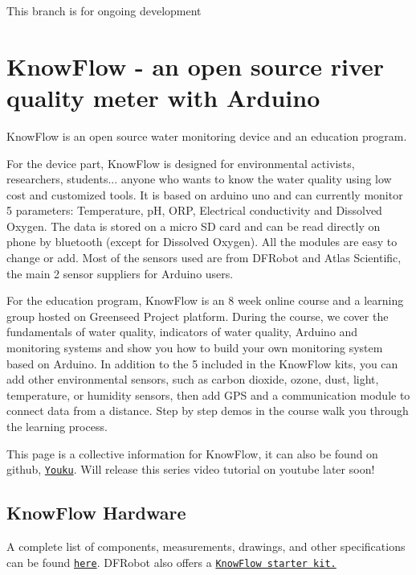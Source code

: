 This branch is for ongoing development

\section*{Know\+Flow -\/ an open source river quality meter with Arduino}

Know\+Flow is an open source water monitoring device and an education program.



For the device part, Know\+Flow is designed for environmental activists, researchers, students... anyone who wants to know the water quality using low cost and customized tools. It is based on arduino uno and can currently monitor 5 parameters\+: Temperature, pH, O\+RP, Electrical conductivity and Dissolved Oxygen. The data is stored on a micro SD card and can be read directly on phone by bluetooth (except for Dissolved Oxygen). All the modules are easy to change or add. Most of the sensors used are from D\+F\+Robot and Atlas Scientific, the main 2 sensor suppliers for Arduino users.



For the education program, Know\+Flow is an 8 week online course and a learning group hosted on Greenseed Project platform. During the course, we cover the fundamentals of water quality, indicators of water quality, Arduino and monitoring systems and show you how to build your own monitoring system based on Arduino. In addition to the 5 included in the Know\+Flow kits, you can add other environmental sensors, such as carbon dioxide, ozone, dust, light, temperature, or humidity sensors, then add G\+PS and a communication module to connect data from a distance. Step by step demos in the course walk you through the learning process.

This page is a collective information for Know\+Flow, it can also be found on github, \href{http://v.youku.com/v_show/id_XMTYzNTA1NzU1Mg==.html?spm=a2hzp.8253876.0.0&f=27620513}{\tt Youku}. Will release this series video tutorial on youtube later soon!

\subsection*{Know\+Flow Hardware}

A complete list of components, measurements, drawings, and other specifications can be found \href{https://docs.google.com/spreadsheets/d/1rwVUIwqTOvZiKi_0vdBPrXMIw2YB-nsFnhaVy5seE-M}{\tt here}. D\+F\+Robot also offers a \href{https://www.dfrobot.com/product-1649.html}{\tt Know\+Flow starter kit.}

